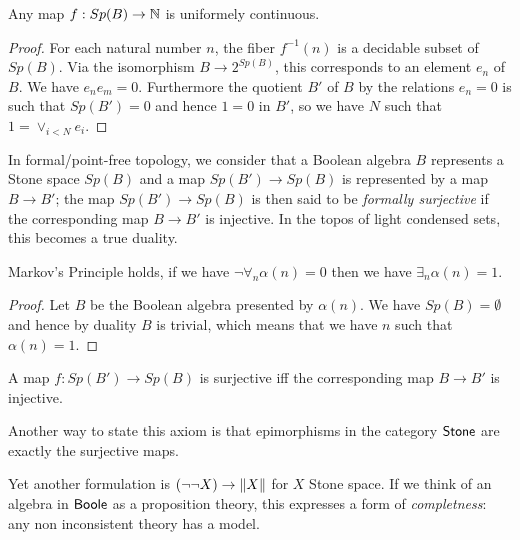 \medskip

\begin{proposition}
Any map $f: Sp(B)\rightarrow\mathbb{N}$ is uniformely continuous.
\end{proposition}  

\begin{proof}
  For each natural number $n$, the fiber $f^{-1}(n)$ is a decidable
  subset of $Sp(B)$. Via the isomorphism $B\rightarrow 2^{Sp(B)}$, this corresponds to an element $e_n$ of $B$. We have
  $e_ne_m = 0$. Furthermore the quotient $B'$ of $B$ by the relations $e_n = 0$ is such that $Sp(B') = 0$ and hence
  $1 = 0$ in $B'$, so we have $N$ such that $1 = \vee_{i<N}e_i$.
\end{proof}

\medskip

In formal/point-free topology, we consider that a Boolean algebra $B$ represents a Stone space $Sp(B)$ and a map
$Sp(B') \to Sp(B)$ is represented by a map $B\rightarrow B'$; the map $Sp(B')\to Sp(B)$ is then said to be
{\em formally surjective} if the corresponding map $B\to B'$ is injective. In the topos of light condensed sets,
this becomes a true duality.

\begin{proposition}\label{PropMarkov}
Markov's Principle holds, if we have $\neg \forall_n\alpha(n) = 0$ then we have $\exists_n \alpha(n) = 1$.
\end{proposition}

\begin{proof}
  Let $B$ be the Boolean algebra presented by $\alpha(n)$. We have $Sp(B) = \emptyset$ and hence by duality
  $B$ is trivial, which means that we have $n$ such that $\alpha(n) = 1$.
\end{proof}


\begin{axiomNum}
  A map $f:Sp(B')\to Sp(B)$ is surjective iff the corresponding map $B \to B'$ is injective.
\end{axiomNum} 

Another way to state this axiom is that epimorphisms in the category $\mathsf{Stone}$ are exactly the surjective maps.

Yet another formulation is $(\neg \neg X)\rightarrow \lVert X \rVert$ for $X$ Stone space. If we think of an algebra
in $\mathsf{Boole}$ as a proposition theory, this expresses a form of {\em completness}: any non inconsistent theory has
a model. 

\medskip

